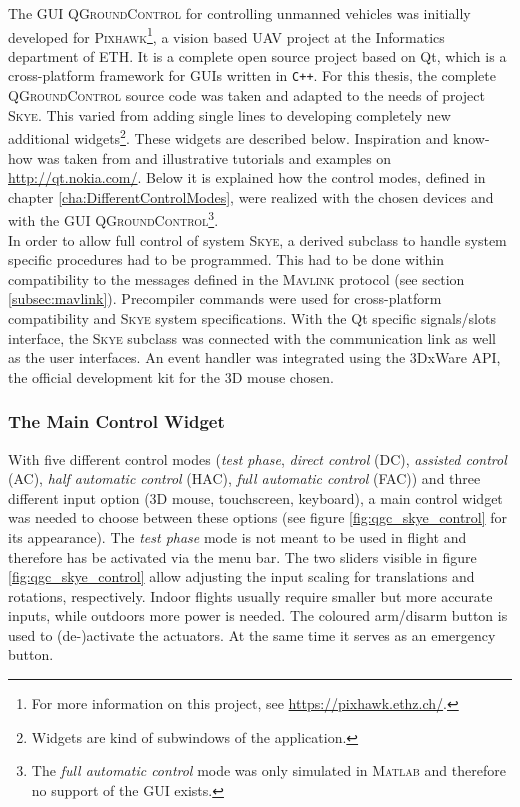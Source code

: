 The GUI \textsc{QGroundControl} for controlling unmanned vehicles was initially developed for \textsc{Pixhawk}\footnote{For more information on this project, see \url{https://pixhawk.ethz.ch/}.}, a vision based UAV project at the Informatics department of \textsc{ETH}. It is a complete open source project based on Qt, which is a cross-platform framework for GUIs written in \verb!C++!. For this thesis, the complete \textsc{QGroundControl} source code was taken and adapted to the needs of project \textsc{Skye}. This varied from adding single lines to developing completely new additional widgets\footnote{Widgets are kind of subwindows of the application.}. These widgets are described below. Inspiration and know-how was taken from \cite{blanchette} and illustrative tutorials and examples on \url{http://qt.nokia.com/}. Below it is explained how the control modes, defined in chapter \ref{cha:DifferentControlModes}, were realized with the chosen devices and with the GUI \textsc{QGroundControl}\footnote{The \textit{full automatic control} mode was only simulated in \textsc{Matlab} and therefore no support of the GUI exists.}. 
\\
In order to allow full control of system \textsc{Skye}, a derived subclass to handle system specific procedures had to be programmed. 
This had to be done within compatibility to the messages defined in the \textsc{Mavlink} protocol (see section \ref{subsec:mavlink}). Precompiler commands were used for cross-platform compatibility and \textsc{Skye} system specifications. 
With the Qt specific signals/slots interface, the \textsc{Skye} subclass was connected with the communication link as well as the user interfaces. 
An event handler was integrated using the 3DxWare API, the official development kit for the 3D mouse chosen.

\subsubsection{The Main Control Widget}
With five different control modes (\textit{test phase}, \textit{direct control} (DC), \textit{assisted control} (AC), \textit{half automatic control} (HAC), \textit{full automatic control} (FAC)) and three different input option (3D mouse, touchscreen, keyboard), a main control widget was needed to choose between these options (see figure \ref{fig:qgc_skye_control} for its appearance). 
The \textit{test phase} mode is not meant to be used in flight and therefore has be activated via the menu bar.
The two sliders visible in figure \ref{fig:qgc_skye_control} allow adjusting the input scaling for translations and rotations, respectively. Indoor flights usually require smaller but more accurate inputs, while outdoors more power is needed. The coloured arm/disarm button is used to (de-)activate the actuators. At the same time it serves as an emergency button.

